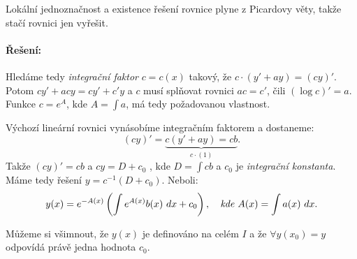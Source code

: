 \documentclass[10pt,a4paper]{article}
\begin{document}
Lokální jednoznačnost a existence řešení rovnice plyne z Picardovy věty, takže stačí rovnici jen vyřešit.

\paragraph{Řešení:} 

Hledáme tedy \textit{integrační faktor} $c = c(x)$ takový, že $c \cdot (y' + ay) = (cy)'$.
Potom $ cy' + acy = cy' + c'y $ a $ c $ musí splňovat rovnici $ac = c'$, čili $(\log c)' = a$.
Funkce $c = e^A$, kde $A = \int a$, má tedy požadovanou vlastnost. 

Výchozí lineární rovnici vynásobíme integračním faktorem a dostaneme: $$ (cy)' = \underbrace{c(y' + ay) = cb}_{c\cdot (1)}. $$
Takže $(cy)' = cb$ a $cy = D + c_0$ , kde $D = \int cb$ a $c_0$ je \textit{integrační konstanta}. Máme tedy řešení $y = c^{-1} (D + c_0)$. Neboli: 
\[
	y(x) = e^{-A(x)} \left(\int e^{A(x)}b(x) ~dx + c_0\right), \textit{\quad kde } A(x) = \int a(x) ~dx.
\]

Můžeme si všimnout, že $y(x)$ je definováno na celém $ I $ a že $\forall y(x_0) = y$ odpovídá právě jedna hodnota $ c_0 $.
\end{document}
